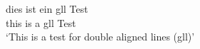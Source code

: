 \ea
 \gll dies ist ein gll Test\\
      this is a gll Test\\
 \glt `This is a test for double aligned lines (gll)'
\z


